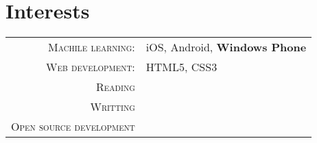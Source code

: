%
%
%

\section{\texorpdfstring{\color{Blue}Interests}{Interests}}
\begin{tabular}{rl}
    \textsc{Machile learning:} & iOS, Android, \textbf{Windows Phone}\\
    \textsc{Web development:} & HTML5, CSS3 \\ 
    \textsc{Reading} & \\
    \textsc{Writting} & \\
    \textsc{Open source development} & \\
\end{tabular}